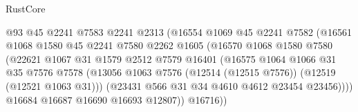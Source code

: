 \begin{lexlean}{RustCore}
\begin{coremodule}
                                        @93
                                        @45
                                        @2241
                                        @7583
                                        @2241
                                        @2313
                                        (@16554
                                          @1069
                                          @45
                                          @2241
                                          @7582
                                          (@16561
                                            @1068
                                            @1580
                                            @45
                                            @2241
                                            @7580
                                            @2262
                                            @1605
                                            (@16570
                                              @1068
                                              @1580
                                              @7580
                                              (@22621
                                                @1067
                                                @31
                                                @1579
                                                @2512
                                                @7579
                                                @16401
                                                (@16575
                                                  @1064
                                                  @1066
                                                  @31
                                                  @35
                                                  @7576
                                                  @7578
                                                  (@13056
                                                    @1063
                                                    @7576
                                                    (@12514 (@12515 @7576))
                                                    (@12519 (@12521 @1063 @31)))
                                                  (@23431 @566 @31 @34 @4610 @4612 @23454 @23456))))
                                            @16684
                                            @16687
                                            @16690
                                            @16693
                                            @12807))
                                        @16716))

\end{coremodule}
\end{lexlean}
